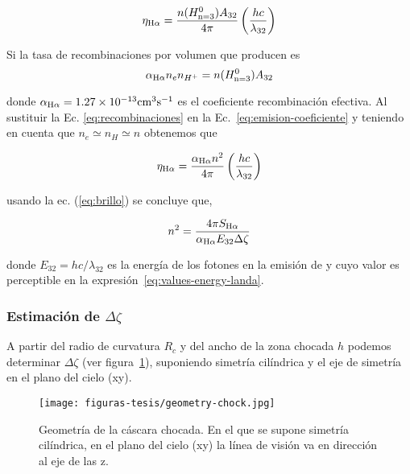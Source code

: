   \begin{equation}
    \label{eq:emision-coeficiente}
    \eta_{\mathrm{H}\alpha} = \frac{n(H^0_{\text{n}=3})A_{32}}{4 \pi} \left(\frac{hc}{\lambda_{32}}\right) 
  \end{equation}

 Si la tasa de recombinaciones por volumen que producen \ha{} es 
\begin{equation}
  \label{eq:recombinaciones}
  \alpha_{\mathrm{H}\alpha} n_{e}n_{H^{+}}=n(H^0_{\text{n}=3})A_{32}
\end{equation}

donde  \(\alpha_{\mathrm{H}\alpha}=1.27\times 10^{-13}\mathrm{cm}^{3} \text{s}^{-1} \) es el coeficiente recombinación efectiva. Al sustituir la Ec. \ref{eq:recombinaciones} en la Ec.~\ref{eq:emision-coeficiente} y teniendo en cuenta que \(n_{e}\simeq n_{H} \simeq n\) obtenemos que

\begin{equation*}
 \eta_{\mathrm{H}\alpha} =  \frac{\alpha_{\mathrm{H}\alpha}n^{2}}{4\pi} \left(\frac{hc}{\lambda_{32}}\right)  
\end{equation*}

 usando la ec. (\ref{eq:brillo}) se concluye que,

\begin{equation}
  \label{eq:densidad}
  n^{2}=\frac{4 \pi S_{\mathrm{H}\alpha}}{\alpha_{\mathrm{H}\alpha} E_{32} \Delta \zeta}
\end{equation}

\noindent donde \( E_{32} = hc/\lambda_{32}\)  es la energía de los fotones en la emisión de \ha{} y cuyo valor es perceptible en la expresión~\ref{eq:values-energy-landa}. 

\subsubsection{Estimación de \(\Delta \zeta\)}
\label{sec:camino}

A partir del radio de curvatura \(R_{c}\) y del ancho de la zona chocada \(h\) podemos determinar \(\Delta \zeta\) (ver figura~\ref{fig:geometria}), suponiendo simetría cilíndrica y el eje de simetría en el plano del cielo (xy).\\

\begin{figure}
  \centering
  \texttt{[image: figuras-tesis/geometry-chock.jpg]}
  \caption{Geometría de la cáscara chocada. En el que se supone simetría cilíndrica, en el plano del cielo (xy) la línea de visión va en dirección al eje de las z. }
  \label{fig:geometria}
\end{figure}


